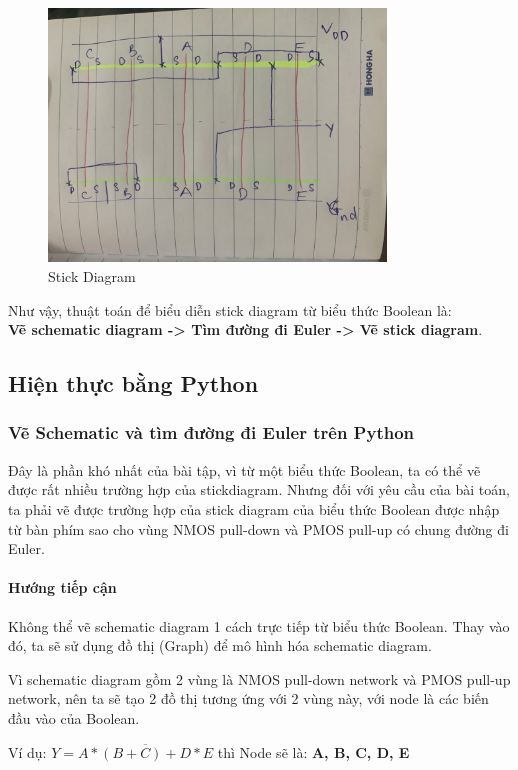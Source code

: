 \documentclass[a4paper,12pt]{article}
\begin{document}
\begin{figure}[H]
    \centering
    \includegraphics[width=0.8\textwidth]{../PNG/Stick_handwrite.jpg}
    \caption{Stick Diagram}
    \label{fig:Stick_Diagram}
\end{figure}

Như vậy, thuật toán để biểu diễn stick diagram từ biểu thức Boolean là:\\
\textbf{Vẽ schematic diagram -> Tìm đường đi Euler -> Vẽ stick diagram}.
\newpage
\subsection{Hiện thực bằng Python}
\subsubsection{Vẽ Schematic và tìm đường đi Euler trên Python}
Đây là phần khó nhất của bài tập, vì từ một biểu thức Boolean, ta có thể vẽ được rất nhiều trường hợp của stickdiagram.
Nhưng đối với yêu cầu của bài toán, ta phải vẽ được trường hợp của stick diagram của biểu thức Boolean được nhập từ bàn phím
sao cho vùng NMOS pull-down và PMOS pull-up có chung đường đi Euler.
\paragraph{Hướng tiếp cận}
Không thể vẽ schematic diagram 1 cách trực tiếp từ biểu thức Boolean.
Thay vào đó, ta sẽ sử dụng đồ thị (Graph) để mô hình hóa schematic diagram.

Vì schematic diagram gồm 2 vùng là NMOS pull-down network và PMOS pull-up network, nên ta sẽ tạo 2 đồ thị tương ứng với 2 vùng này, 
với node là các biến đầu vào của Boolean.

Ví dụ: \( Y = \overline{A *(B + C) + D * E} \) thì Node sẽ là:
\textbf{A, B, C, D, E}
\end{document}

